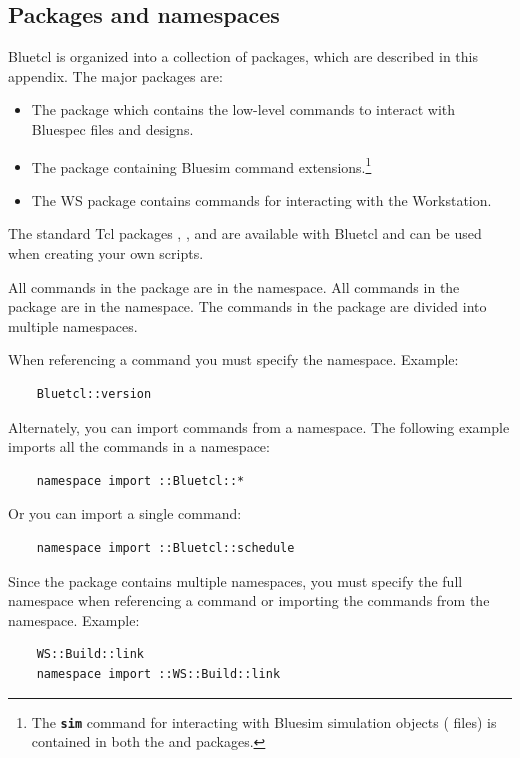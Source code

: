 \subsection{Packages and namespaces}
\label{packages}
Bluetcl is organized into a collection of packages, which are
described in this appendix. The major packages are:
\begin{itemize}
\item The  package which contains the low-level commands  to  interact with Bluespec files and designs.  
\item The  package containing Bluesim command extensions.\footnote{The  {\bf\tt sim} command for interacting with
Bluesim simulation objects ( files) is contained in both the
 and  packages.}
\item The WS package contains commands for interacting with the Workstation.
\end{itemize}

The  standard Tcl packages , , and  are
 available with Bluetcl  and can be used
 when creating  your own scripts.  

All commands in the  package are in the 
namespace.  All commands in the  package are in the
 namespace.   The commands in the  package are
divided into multiple namespaces.

When referencing a command you must specify the namespace.  Example:
\begin{verbatim}
    Bluetcl::version
\end{verbatim}
Alternately, you can import commands from a namespace.  The following example
imports all the commands in a namespace:
\begin{verbatim}
    namespace import ::Bluetcl::*
\end{verbatim}
Or you can import a single command:
\begin{verbatim}
    namespace import ::Bluetcl::schedule
\end{verbatim}

Since the  package contains multiple namespaces,  you must
specify the full namespace when referencing a  command or
importing the commands from the namespace.  Example:
\begin{verbatim}
    WS::Build::link
    namespace import ::WS::Build::link
\end{verbatim}

